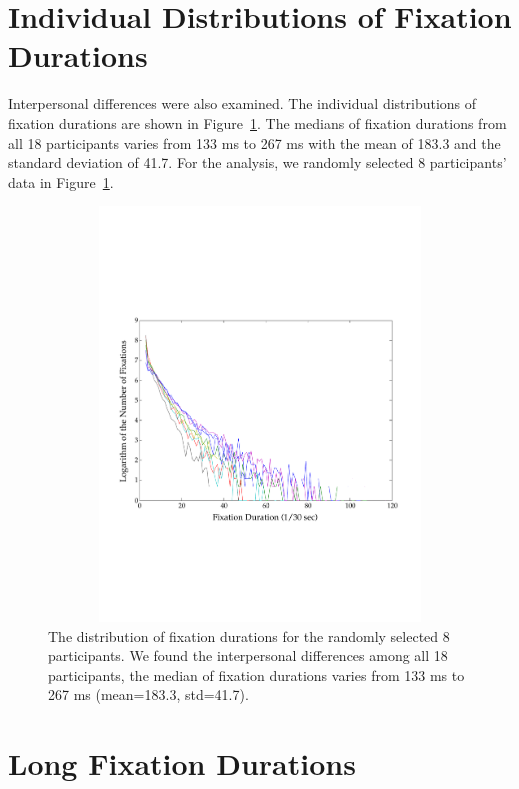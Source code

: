 \documentclass[oneside,master]{snueethesis}
\begin{document}
\section{Individual Distributions of Fixation Durations}

Interpersonal differences were also examined. The individual distributions of fixation durations are shown in Figure~\ref{fig:individual-fixation-duration}. The medians of fixation durations from all 18 participants varies from 133 ms to 267 ms with the mean of 183.3 and the standard deviation of 41.7. For the analysis, we randomly selected 8 participants' data in Figure~\ref{fig:individual-fixation-duration}. 


\begin{figure}
  \centerline{\includegraphics[width=150mm,height=110mm,trim=0mm 60mm 0mm 60mm]{./eps/individual_fixation_duration.pdf}}
  \caption[The distribution of fixation durations for individuals]{The distribution of fixation durations for the randomly selected 8 participants. We found the interpersonal differences among all 18 participants, the median of fixation durations varies from 133 ms to 267 ms (mean=183.3, std=41.7).}
  \label{fig:individual-fixation-duration}
\end{figure}


\section{Long Fixation Durations}
\label{subsec:Long-Fixation-Durations}
\end{document}
